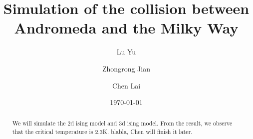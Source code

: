 \documentclass[%
 reprint,
 amsmath,amssymb,
 aps,
]{revtex4-1}
\begin{document}

\title{Simulation of the collision between Andromeda and the Milky Way
}%

\author{Lu Yu} 
\author{Zhongrong Jian}
 \author{Chen Lai}
%

%
%

\date{\today}%










\begin{abstract}
We will simulate the 2d ising model and 3d ising model. From the result, we observe that the critical temperature is 2.3K.  blabla, Chen will finish it later.
\end{abstract}
\end{document}
